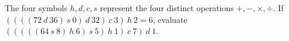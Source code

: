 The four symbols $h,d,c,s$ represent the four distinct operations $+,-,\times,\div$. If $((((72\ d\ 36)\ s\ 0)\ d\ 32)\ c\ 3)\ h\ 2=6$, evaluate $(((((64\ s\ 8)\ h\ 6)\ s\ 5)\ h\ 1)\ c\ 7)\ d\ 1$.
